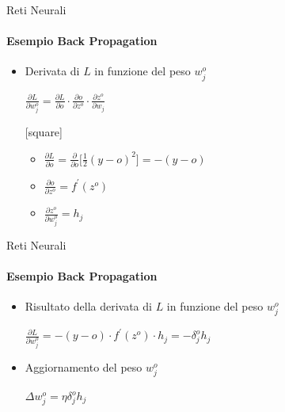 \documentclass[
 ]{beamer}
\begin{document}
\begin{frame}{Reti Neurali}
    \framesubtitle{Esempio Back Propagation}
    \begin{itemize} [<+->]
        \setlength\itemsep{2em}
        \item \large Derivata di $L$ in funzione del peso $w_j^{o}$ 
        
        \bigskip
        \begin{center}
         \large $ \frac{\partial L}{\partial w_j^{o}} =  \frac{\partial L}{\partial o} \cdot \frac{\partial o}{\partial z^{o}} \cdot \frac{\partial z^{o}}{\partial w_j}$         
         \end{center}
         
         \bigskip
         [square]
         \begin{itemize}
            \setlength\itemsep{2.5em}
            \item \large $\frac{\partial L}{\partial o} = \frac{\partial}{\partial o} \big[ \frac{1}{2}(y - o)^{2} \big] = -(y - o)$
            \item \large $\frac{\partial o}{\partial z^{o}} = f^{\prime}(z^{o})$
            \item \large $\frac{\partial z^{o}}{\partial w_j^{o}} = h_j$ 
         \end{itemize}
    \end{itemize}
\end{frame}


\begin{frame}{Reti Neurali}
    \framesubtitle{Esempio Back Propagation}
    \begin{itemize} [<+->]
        \setlength\itemsep{3em}
        \item \large Risultato della derivata di $L$ in funzione del peso $w_j^{o}$
        \bigskip
        \begin{center}
         \large $ \frac{\partial L}{\partial w_j^{o}} =  -(y - o) \cdot f^{\prime}(z^{o}) \cdot h_j = -\delta_j^{o}h_j$         
         \end{center}
         \item \large Aggiornamento del peso $w_j^{o}$
         \bigskip
         \begin{center}
         \large $ \Delta w_j^{o} = \eta\delta_j^{o}h_j$         
         \end{center}       
    \end{itemize}
\end{frame}
\end{document}
